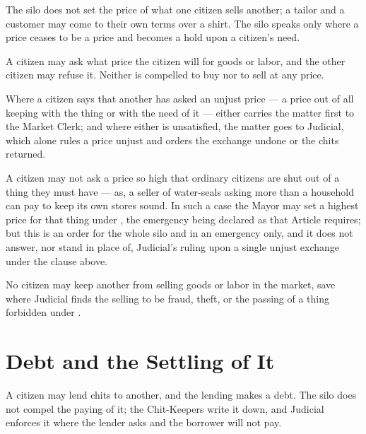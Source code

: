 The silo does not set the price of what one citizen sells another; a tailor and a customer may come to their own terms over a shirt. The silo speaks only where a price ceases to be a price and becomes a hold upon a citizen's need.

\begin{clauses}
\item A citizen may ask what price the citizen will for goods or labor, and the other citizen may refuse it. Neither is compelled to buy nor to sell at any price.
\item Where a citizen says that another has asked an unjust price --- a price out of all keeping with the thing or with the need of it --- either carries the matter first to the Market Clerk; and where either is unsatisfied, the matter goes to Judicial, which alone rules a price unjust and orders the exchange undone or the chits returned.
\item A citizen may not ask a price so high that ordinary citizens are shut out of a thing they must have --- as, a seller of water-seals asking more than a household can pay to keep its own stores sound. In such a case the Mayor may set a highest price for that thing under , the emergency being declared as that Article requires; but this is an order for the whole silo and in an emergency only, and it does not answer, nor stand in place of, Judicial's ruling upon a single unjust exchange under the clause above.
\item No citizen may keep another from selling goods or labor in the market, save where Judicial finds the selling to be fraud, theft, or the passing of a thing forbidden under .
\end{clauses}

\section{Debt and the Settling of It}
\label{sec:commerce:debt-and-the-settling-of-it}

A citizen may lend chits to another, and the lending makes a debt. The silo does not compel the paying of it; the Chit-Keepers write it down, and Judicial enforces it where the lender asks and the borrower will not pay.

